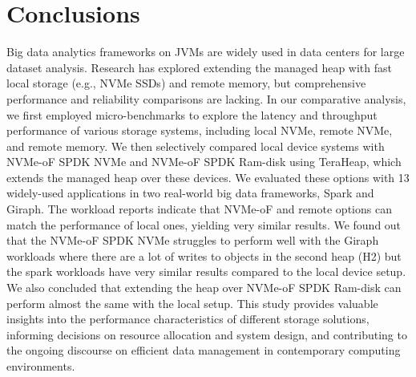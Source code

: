 \section{Conclusions}
Big data analytics frameworks on JVMs are widely used in data centers for large dataset analysis. Research has explored extending the managed heap with fast local storage (e.g., NVMe SSDs) and remote memory, but comprehensive performance and reliability comparisons are lacking. In our comparative analysis, we first employed micro-benchmarks to explore the latency and throughput performance of various storage systems, including local NVMe, remote NVMe, and remote memory. We then selectively compared local device systems with NVMe-oF SPDK NVMe and NVMe-oF SPDK Ram-disk using TeraHeap, which extends the managed heap over these devices. We evaluated these options with 13 widely-used applications in two real-world big data frameworks, Spark and Giraph. The workload reports indicate that NVMe-oF and remote options can match the performance of local ones, yielding very similar results. We found out that the NVMe-oF SPDK NVMe struggles to perform well with the Giraph workloads where there are a lot of writes to objects in the second heap (H2) but the spark workloads have very similar results compared to the local device setup. We also concluded that extending the heap over NVMe-oF SPDK Ram-disk can perform almost the same with the local setup. This study provides valuable insights into the performance characteristics of different storage solutions, informing decisions on resource allocation and system design, and contributing to the ongoing discourse on efficient data management in contemporary computing environments.